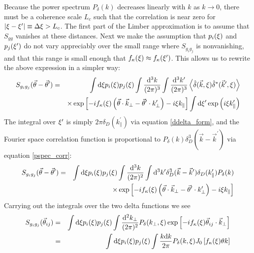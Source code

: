 Because the power spectrum $P_\delta(k)$ decreases linearly with $k$ as 
$k\to0$, there must be a coherence scale $L_c$ such that the
correlation is near zero for 
$|\xi-\xi^\prime| \equiv \Delta\xi > L_c$.  
The first part of the Limber approximation is to assume that $S_{gg}$ vanishes
at these distances.
Next we make the assumption that $p_i(\xi)$ and 
$p_j(\xi^\prime)$ do not vary appreciably over the small range where
$S_{g_ig_j}$ is nonvanishing, and that this range is small enough that 
$f_\kappa(\xi) \approx f_\kappa(\xi^\prime)$. 
This allows us to rewrite the above expression in a simpler way:
\begin{eqnarray}
  S_{g_ig_j}(\vec\theta-\vec\theta^\prime) 
  &=& \int \mathrm{d}\xi p_i(\xi)p_j(\xi)
  \int \frac{\mathrm{d}^3k}{(2\pi)^3}\int \frac{\mathrm{d}^3k^\prime}{(2\pi)^3} 
  \left\langle\hat\delta(\vec k,\xi)
  \hat\delta^*(\vec k^\prime, \xi)
  \right\rangle\nonumber\\
  &&\times
  \exp\left[-i f_\kappa(\xi) 
    \left(\vec{\theta} \cdot \vec k_\perp 
    - \vec{\theta}^\prime \cdot k^\prime_\perp \right) 
    -i \xi k_\parallel \right]
  \int \mathrm{d}\xi^\prime\exp\left(i\xi k^\prime_\parallel\right)
\end{eqnarray}
The integral over $\xi^\prime$ is 
simply $2\pi\delta_D(k^\prime_\parallel)$
via equation \ref{ddelta_form}, and the Fourier space correlation function
is proportional to $P_\delta(k)\delta^3_D(\vec k-\vec k^\prime)$ 
via equation \ref{pspec_corr}:
\begin{eqnarray}
  S_{g_ig_j}(\vec\theta-\vec\theta^\prime) 
  &=& \int \mathrm{d}\xi p_i(\xi)p_j(\xi)
  \int \frac{\mathrm{d}^3k}{(2\pi)^2}\int \mathrm{d}^3k^\prime
  \delta_D^3(\vec k-\vec k^\prime)\delta_D(k_\parallel^\prime)P_\delta(k)\nonumber\\
  &&\times
  \exp\left[-i f_\kappa(\xi) 
    \left(\vec{\theta} \cdot \vec k_\perp 
    - \vec{\theta}^\prime \cdot k^\prime_\perp \right) 
    -i \xi k_\parallel \right]
\end{eqnarray}
Carrying out the integrals over the two delta functions we see
\begin{eqnarray}
  \label{Limber}
  S_{g_ig_j}(\vec\theta_{ij}) 
  &=& \int \mathrm{d}\xi p_i(\xi)p_j(\xi)
  \int \frac{\mathrm{d}^2k_\perp}{(2\pi)^2}
  P_\delta(k_\perp,\xi)
  \exp\left[-i f_\kappa(\xi) 
    \vec \theta_{ij} \cdot \vec k_\perp 
    \right]\\
  \label{Limber2}
  &=& \int \mathrm{d}\xi p_i(\xi)p_j(\xi)
  \int \frac{k\mathrm{d} k}{2\pi}P_\delta(k,\xi)
  J_0\left[f_\kappa(\xi)\theta k\right]
\end{eqnarray}
